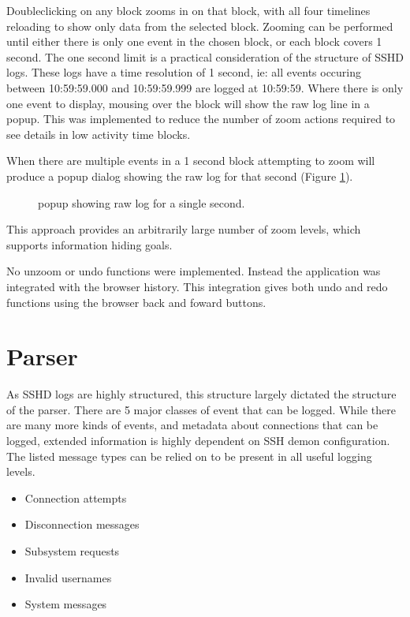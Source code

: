 Doubleclicking on any block zooms in on that block, with all four timelines reloading to show only data from the selected block. 
Zooming can be performed until either there is only one event in the chosen block, or each block covers 1 second. The one second limit is a practical consideration of the structure of SSHD logs. These logs have a time resolution of 1 second, ie:  all events occuring between 10:59:59.000 and 10:59:59.999 are logged at 10:59:59. Where there is only one event to display, mousing over the block will show the raw log line in a popup. This was implemented to reduce the number of zoom actions required to see details in low activity time blocks.

When there are multiple events in a 1 second block attempting to zoom will produce a popup dialog showing the raw log for that second (Figure \ref{des_one_second}).

\begin{figure}[tbh]
\caption{\protect\label{des_one_second}popup showing raw log for a single second.}
\end{figure}

This approach provides an arbitrarily large number of zoom levels, which supports information hiding goals.

No unzoom or undo functions were implemented. Instead the application was integrated with the browser history. This integration gives both undo and redo functions using the browser back and foward buttons. 

\section{Parser}\label{parser}

As SSHD logs are highly structured, this structure largely dictated the structure of the parser. There are 5 major classes of event that can be logged. While there are many more kinds of events, and metadata about connections that can be logged, extended information is highly dependent on SSH demon configuration. The listed message types can be relied on to be present in all useful logging levels. 
\begin{itemize}
\item{Connection attempts}
\item{Disconnection messages}
\item{Subsystem requests}
\item{Invalid usernames}
\item{System messages}
\end{itemize}

